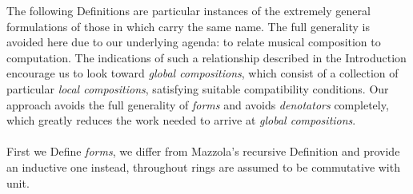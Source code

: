 The following Definitions are particular instances of the extremely general formulations of those in \cite{Mazzola} which carry the same name. The full generality is avoided here due to our underlying agenda: to relate musical composition to computation. The indications of such a relationship described in the Introduction encourage us to look toward \emph{global compositions}, which consist of a collection of particular \emph{local compositions}, satisfying suitable compatibility conditions. Our approach avoids the full generality of \emph{forms} and avoids \emph{denotators} completely, which greatly reduces the work needed to arrive at \emph{global compositions}.\\\\
%
First we Define \emph{forms}, we differ from Mazzola's recursive Definition and provide an inductive one instead, throughout rings are assumed to be commutative with unit.

